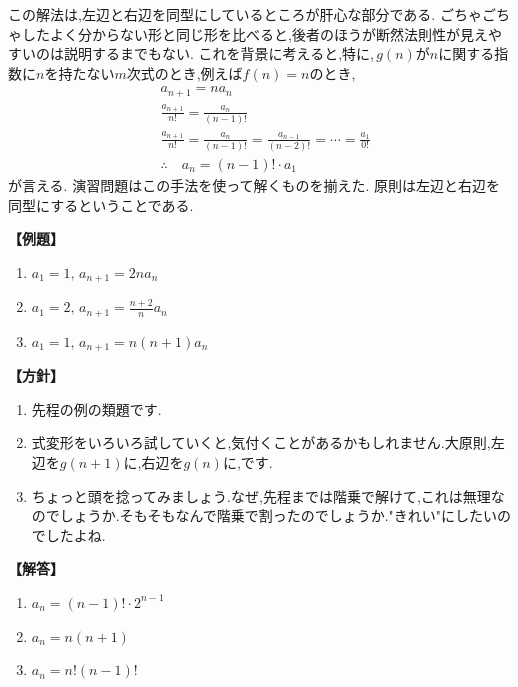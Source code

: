この解法は,左辺と右辺を同型にしているところが肝心な部分である.
ごちゃごちゃしたよく分からない形と同じ形を比べると,後者のほうが断然法則性が見えやすいのは説明するまでもない.
これを背景に考えると,特に,\,$g(n)$が$n$に関する指数に$n$を持たない$m$次式のとき,例えば$f(n)=n$のとき,
\begin{align*}
   & a_{n+1}=na_n                                                                       \\
   & \frac{a_{n+1}}{n!}=\frac{a_n}{(n-1)!}                                              \\
   & \frac{a_{n+1}}{n!}=\frac{a_n}{(n-1)!}=\frac{a_{n-1}}{(n-2)!}=\cdots=\frac{a_1}{0!} \\
   & \therefore \quad a_n=(n-1)!\cdot a_1
\end{align*}
が言える.
演習問題はこの手法を使って解くものを揃えた.
原則は左辺と右辺を同型にするということである.

\noindent \textbf{【例題】}
\begin{enumerate}[label=(\arabic*),parsep=3pt]
  \item $\displaystyle a_1=1,\, a_{n+1}=2na_n$
  \item $\displaystyle a_1=2,\, a_{n+1}=\frac{n+2}{n}a_n$
  \item $\displaystyle a_1=1,\, a_{n+1}=n(n+1)a_n$
\end{enumerate}

\noindent\textbf{【方針】}
\begin{enumerate}[label=(\arabic*),parsep=3pt]
  \item 先程の例の類題です.
  \item 式変形をいろいろ試していくと,気付くことがあるかもしれません.大原則,左辺を$g(n+1)$に,右辺を$g(n)$に,です.
  \item ちょっと頭を捻ってみましょう.なぜ,先程までは階乗で解けて,これは無理なのでしょうか.そもそもなんで階乗で割ったのでしょうか."きれい"にしたいのでしたよね.
\end{enumerate}

\noindent\textbf{【解答】}
\begin{enumerate}[label=(\arabic*),parsep=3pt]
  \item $\displaystyle a_n=(n-1)!\cdot 2^{n-1}$
  \item $\displaystyle a_n=n(n+1)$
  \item $\displaystyle a_n=n!(n-1)!$
\end{enumerate}

